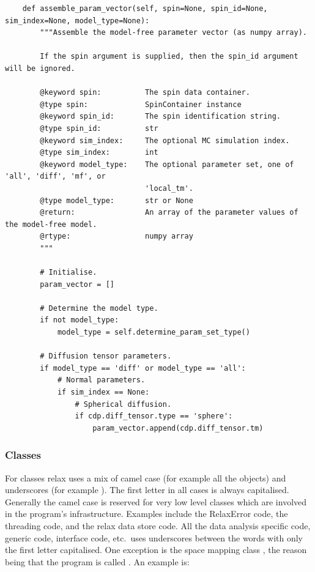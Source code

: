 \begin{footnotesize}
\begin{verbatim}
    def assemble_param_vector(self, spin=None, spin_id=None, sim_index=None, model_type=None):
        """Assemble the model-free parameter vector (as numpy array).

        If the spin argument is supplied, then the spin_id argument will be ignored.

        @keyword spin:          The spin data container.
        @type spin:             SpinContainer instance
        @keyword spin_id:       The spin identification string.
        @type spin_id:          str
        @keyword sim_index:     The optional MC simulation index.
        @type sim_index:        int
        @keyword model_type:    The optional parameter set, one of 'all', 'diff', 'mf', or
                                'local_tm'. 
        @type model_type:       str or None
        @return:                An array of the parameter values of the model-free model.
        @rtype:                 numpy array
        """

        # Initialise.
        param_vector = []

        # Determine the model type.
        if not model_type:
            model_type = self.determine_param_set_type()

        # Diffusion tensor parameters.
        if model_type == 'diff' or model_type == 'all':
            # Normal parameters.
            if sim_index == None:
                # Spherical diffusion.
                if cdp.diff_tensor.type == 'sphere':
                    param_vector.append(cdp.diff_tensor.tm)
\end{verbatim}
\end{footnotesize}



\subsubsection{Classes}

For classes relax uses a mix of camel case (for example all the  objects) and underscores (for example ).  The first letter in all cases is always capitalised.  Generally the camel case is reserved for very low level classes which are involved in the program's infrastructure.  Examples include the RelaxError code, the threading code, and the relax data store code.  All the data analysis specific code, generic code, interface code, etc.\ uses underscores between the words with only the first letter capitalised.  One exception is the space mapping class , the reason being that the program is called .  An example is:

